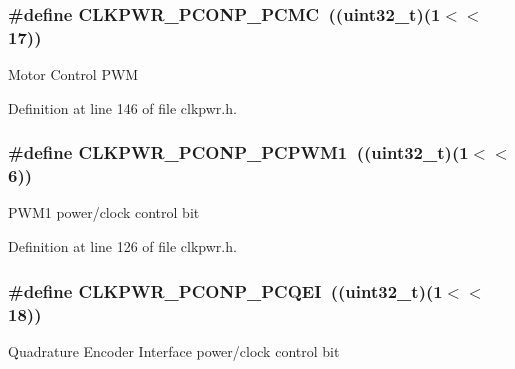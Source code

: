 \subsubsection[{\texorpdfstring{C\+L\+K\+P\+W\+R\+\_\+\+P\+C\+O\+N\+P\+\_\+\+P\+C\+MC}{CLKPWR_PCONP_PCMC}}]{\setlength{\rightskip}{0pt plus 5cm}\#define C\+L\+K\+P\+W\+R\+\_\+\+P\+C\+O\+N\+P\+\_\+\+P\+C\+MC~(({\bf uint32\+\_\+t})(1$<$$<$17))}\hypertarget{group___c_l_k_p_w_r___public___macros_ga5a8749edeb4ea582cd48f5f35f2088e6}{}\label{group___c_l_k_p_w_r___public___macros_ga5a8749edeb4ea582cd48f5f35f2088e6}
Motor Control P\+WM 

Definition at line 146 of file clkpwr.\+h.

\subsubsection[{\texorpdfstring{C\+L\+K\+P\+W\+R\+\_\+\+P\+C\+O\+N\+P\+\_\+\+P\+C\+P\+W\+M1}{CLKPWR_PCONP_PCPWM1}}]{\setlength{\rightskip}{0pt plus 5cm}\#define C\+L\+K\+P\+W\+R\+\_\+\+P\+C\+O\+N\+P\+\_\+\+P\+C\+P\+W\+M1~(({\bf uint32\+\_\+t})(1$<$$<$6))}\hypertarget{group___c_l_k_p_w_r___public___macros_ga0f01e679f3b6eec995d0fd1ad43dc2d7}{}\label{group___c_l_k_p_w_r___public___macros_ga0f01e679f3b6eec995d0fd1ad43dc2d7}
P\+W\+M1 power/clock control bit 

Definition at line 126 of file clkpwr.\+h.

\subsubsection[{\texorpdfstring{C\+L\+K\+P\+W\+R\+\_\+\+P\+C\+O\+N\+P\+\_\+\+P\+C\+Q\+EI}{CLKPWR_PCONP_PCQEI}}]{\setlength{\rightskip}{0pt plus 5cm}\#define C\+L\+K\+P\+W\+R\+\_\+\+P\+C\+O\+N\+P\+\_\+\+P\+C\+Q\+EI~(({\bf uint32\+\_\+t})(1$<$$<$18))}\hypertarget{group___c_l_k_p_w_r___public___macros_ga0f0ae9eef9bdd20cbeb8789430f6c3ee}{}\label{group___c_l_k_p_w_r___public___macros_ga0f0ae9eef9bdd20cbeb8789430f6c3ee}
Quadrature Encoder Interface power/clock control bit 

